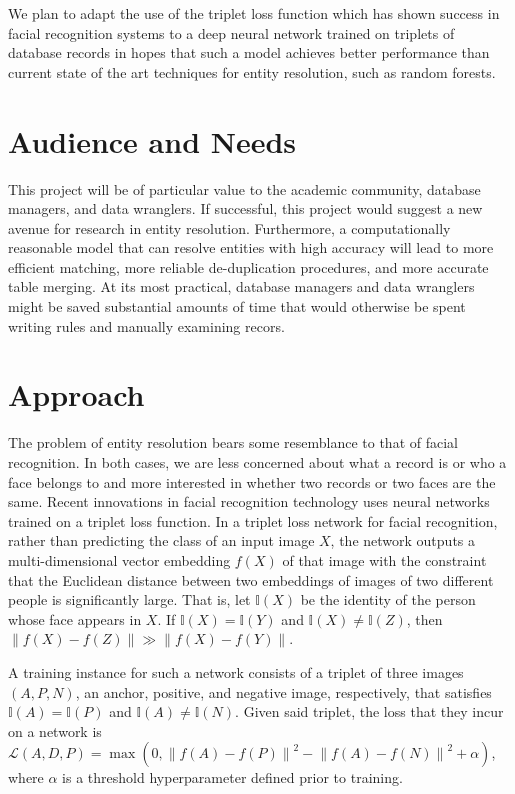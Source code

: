 \documentclass{proc}
\begin{document}
We plan to adapt the use of the triplet loss function which has shown success in facial recognition systems to a deep neural network trained on triplets of database records in hopes that such a model achieves better performance than current state of the art techniques for entity resolution, such as random forests.

\section{Audience and Needs}

This project will be of particular value to the academic community, database managers, and data wranglers. If successful, this project would suggest a new avenue for research in entity resolution. Furthermore, a computationally reasonable model that can resolve entities with high accuracy will lead to more efficient matching, more reliable de-duplication procedures, and more accurate table merging. At its most practical, database managers and data wranglers might be saved substantial amounts of time that would otherwise be spent writing rules and manually examining recors.

\section{Approach}

The problem of entity resolution bears some resemblance to that of facial recognition. In both cases, we are less concerned about what a record is or who a face belongs to and more interested in whether two records or two faces are the same. Recent innovations in facial recognition technology uses neural networks trained on a triplet loss function. In a triplet loss network for facial recognition, rather than predicting the class of an input image $X$, the network outputs a multi-dimensional vector embedding $f(X)$ of that image with the constraint that the Euclidean distance between two embeddings of images of two different people is significantly large. That is, let $\mathbb{I}(X)$ be the identity of the person whose face appears in $X$. If $\mathbb{I}(X) = \mathbb{I}(Y)$ and $\mathbb{I}(X) \neq \mathbb{I}(Z)$, then $\left\|f(X) - f(Z) \right\|  \gg \left\|f(X) - f(Y) \right\|$.

A training instance for such a network consists of a triplet of three images $(A, P, N)$, an anchor, positive, and negative image, respectively, that satisfies $\mathbb{I}(A) = \mathbb{I}(P)$ and $\mathbb{I}(A) \neq \mathbb{I}(N)$. Given said triplet, the loss that they incur on a network is $\mathcal{L}(A, D, P) = \max(0, \left\|f(A) - f(P) \right\|^2 - \left\|f(A) - f(N) \right\|^2 + \alpha)$, where $\alpha$ is a threshold hyperparameter defined prior to training.
\end{document}
